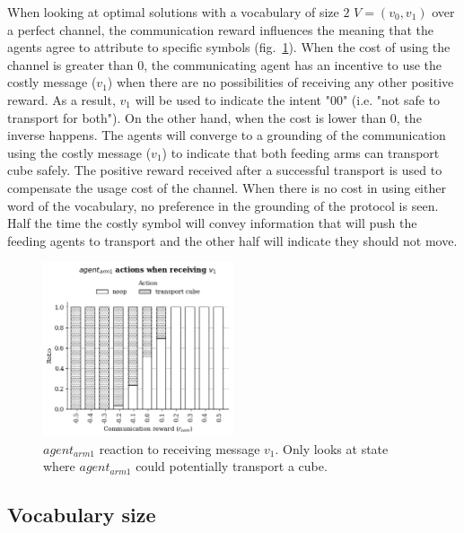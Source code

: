 When looking at optimal solutions with a vocabulary of size $2$ $V = (v_0, v_1)$ over a perfect channel,  the communication reward influences the meaning that the agents agree to attribute to specific symbols (fig.~\ref{fig:exp-2-rwdc}). When the cost of using the channel is greater than $0$, the communicating agent has an incentive to use the costly message ($v_1$) when there are no possibilities of receiving any other positive reward. As a result, $v_1$ will be used to indicate the intent "$00$" (i.e. "not safe to transport for both"). On the other hand, when the cost is lower than $0$, the inverse happens. The agents will converge to a grounding of the communication using the costly message ($v_1$) to indicate that both feeding arms can transport cube safely. The positive reward received after a successful transport is used to compensate the usage cost of the channel. When there is no cost in using either word of the vocabulary, no preference in the grounding of the protocol is seen. Half the time the costly symbol will convey information that will push the feeding agents to transport and the other half will indicate they should not move.

\begin{figure}[H]
\centering
\includegraphics[width=0.5\textwidth]{imgs/exp-2-rwdc-2msg-grounding-a1.png}
\caption[Grounding of communication relative to $r_{com}$ for =2]{$agent_{arm1}$ reaction to receiving message $v_1$. Only looks at state where $agent_{arm1}$ could potentially transport a cube.}
\label{fig:exp-2-rwdc}
\end{figure}


\subsection{Vocabulary size}


